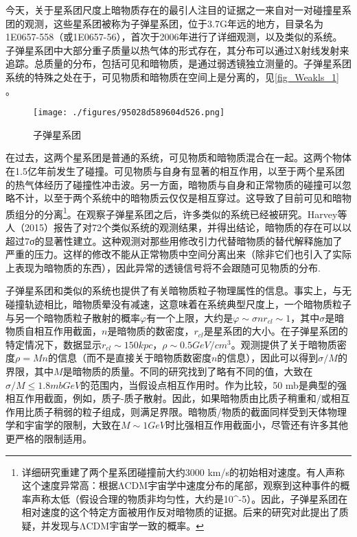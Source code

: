 

今天，关于星系团尺度上暗物质存在的最引人注目的证据之一来自对一对碰撞星系团的观测，这些星系团被称为子弹星系团，位于3.7G年远的地方，目录名为1E0657-558（或1E0657-56），首次于2006年进行了详细观测，以及类似的系统。子弹星系团中大部分重子质量以热气体的形式存在，其分布可以通过X射线发射来追踪。总质量的分布，包括可见和暗物质，是通过弱透镜独立测量的。子弹星系团系统的特殊之处在于，可见物质和暗物质在空间上是分离的，见\autoref{fig_Weakls_1} 。\begin{figure}[ht]
\centering
\texttt{[image: ./figures/95028d589604d526.png]}
\caption{子弹星系团} \label{fig_Weakls_1}
\end{figure}
在过去，这两个星系团是普通的系统，可见物质和暗物质混合在一起。这两个物体在1.5亿年前发生了碰撞。可见物质与自身有显著的相互作用，以至于两个星系团的热气体经历了碰撞性冲击波。另一方面，暗物质与自身和正常物质的碰撞可以忽略不计，以至于两个系统中的暗物质云仅仅是相互穿过。这导致了目前可见和暗物质组分的分离\footnote{详细研究重建了两个星系团碰撞前大约3000 km/s的初始相对速度。有人声称这个速度异常高：根据ΛCDM宇宙学中速度分布的尾部，观察到这种事件的概率声称太低（假设合理的物质非均匀性，大约是10^-5）。因此，子弹星系团在相对速度的这个特定方面被用作反对暗物质的证据。后来的研究对此提出了质疑，并发现与ΛCDM宇宙学一致的概率。}。在观察子弹星系团之后，许多类似的系统已经被研究。Harvey等人（2015）报告了对72个类似系统的观测结果，并得出结论，暗物质的存在可以以超过7σ的显著性建立。这种观测对那些用修改引力代替暗物质的替代解释施加了严重的压力。这样的修改不能从正常物质中空间分离出来（除非它们也引入了实际上表现为暗物质的东西），因此异常的透镜信号将不会跟随可见物质的分布.

子弹星系团和类似的系统也提供了有关暗物质粒子物理属性的信息。事实上，与无碰撞轨迹相比，暗物质晕没有减速，这意味着在系统典型尺度上，一个暗物质粒子与另一个暗物质粒子散射的概率$\varphi$有一个上限，大约是$\varphi \sim \sigma n r_{cl}\sim 1$，其中$\sigma$是暗物质自相互作用截面，$n$是暗物质的数密度，$r_{cl}$是星系团的大小。在子弹星系团的特定情况下，数据显示$r_{cl} \sim 150 kpc$，$\rho\sim 0.5 GeV / cm^3$。观测提供了关于暗物质密度$\rho = Mn$的信息（而不是直接关于暗物质数密度$n$的信息），因此可以得到$\sigma/M$的界限，其中$M$是暗物质的质量。不同的研究找到了略有不同的值，大致在$\sigma/M \leq 1.8 mb GeV$的范围内，当假设点相互作用时。作为比较，50 mb是典型的强相互作用截面，例如，质子-质子散射。因此，如果暗物质由比质子稍重和/或相互作用比质子稍弱的粒子组成，则满足界限。暗物质/物质的截面同样受到天体物理学和宇宙学的限制，大致在$M \sim 1 GeV$时比强相互作用截面小，尽管还有许多其他更严格的限制适用。

